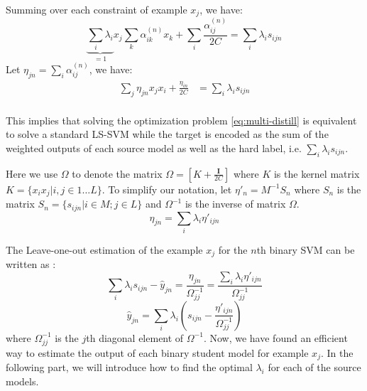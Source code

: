Summing over each constraint of example $x_j$, we have:
\begin{equation}
\underbrace{\sum_i\lambda_i}_{=1} x_j\sum_{k}\alpha^{(n)}_{ik}x_k+\sum_i\frac{\alpha^{(n)}_{ij}}{2C}=\sum_i\lambda_is_{ijn}
\end{equation}
Let %
$\eta_{jn}=\sum_i\alpha^{(n)}_{ij}$, we have:
\begin{equation}
\begin{aligned}
\sum_j\eta_{jn}x_jx_i+\frac{\eta_{in}}{2C}&=\sum_i\lambda_is_{ijn}\\
\end{aligned}
\end{equation}

This implies that solving the optimization problem \eqref{eq:multi-distill} is equivalent to solve a standard LS-SVM while the target is encoded as the sum of the weighted outputs of each source model as well as the hard label, i.e. $\sum_i\lambda_is_{ijn}$.

Here we use $\Omega$ to denote the matrix $\Omega=[K+\frac{\mathbf{I}}{2C}]$ where $K$ is the kernel matrix $K=\{x_ix_j|i,j\in 1\dots L\}$. To simplify our notation, let ${\eta}'_{n}=M^{-1}S_n$ where $S_n$ is the matrix $S_n=\{s_{ijn}|i\in M;j\in L\}$ and $\Omega^{-1}$ is the inverse of matrix $\Omega$. 
\[\eta_{jn}=\sum_i\lambda_i{\eta}'_{ijn}\]

The Leave-one-out estimation of the example $x_j$ for the $n$th binary SVM can be written as \cite{cawley2006leave}:
\[\sum_i\lambda_is_{ijn}-\hat{y}_{jn} =\frac{{\eta}_{jn}}{\Omega_{jj}^{-1}} =\frac{\sum_i\lambda_i{\eta}'_{ijn}}{\Omega_{jj}^{-1}}\]
\begin{equation}\label{eq:yhat}
\hat{y}_{jn} = \sum_i\lambda_i\left(s_{ijn}-\frac{{\eta}'_{ijn}}{\Omega_{jj}^{-1}}\right)
\end{equation}
where $\Omega^{-1}_{jj}$ is the $j$th diagonal element of $\Omega^{-1}$. Now, we have found an efficient way to estimate the output of each binary student model for example $x_j$. In the following part, we will introduce how to find the optimal $\lambda_i$ for each of the source models. 

